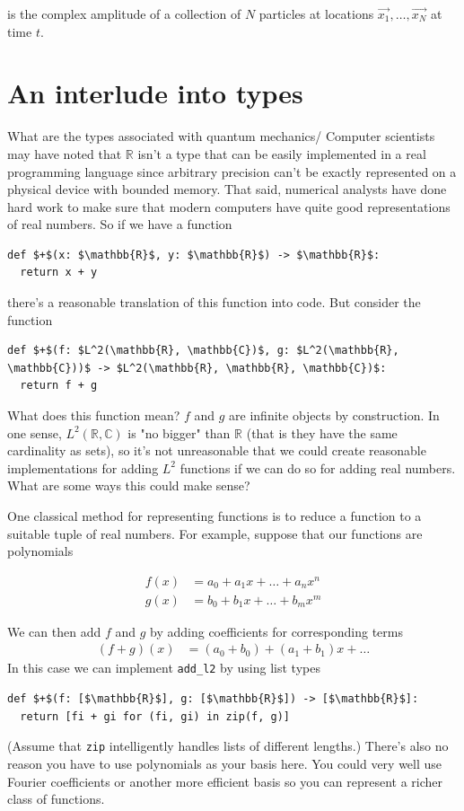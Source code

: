 \documentclass[book.tex]{subfiles}
\begin{document}
is the complex amplitude of a collection of $N$ particles at locations $\vec{x_1}, \dotsc, \vec{x_N}$ at time $t$.

\section{An interlude into types}


What are the types associated with quantum mechanics/ Computer scientists may have noted that $\mathbb{R}$ isn't a type that can be easily implemented in a real programming language since arbitrary precision can't be exactly represented on a physical device with bounded memory. That said, numerical analysts have done hard work to make sure that modern computers have quite good representations of real numbers. So if we have a function

\begin{lstlisting}
def $+$(x: $\mathbb{R}$, y: $\mathbb{R}$) -> $\mathbb{R}$:
  return x + y
\end{lstlisting}

\noindent there's a reasonable translation of this function into code. But consider the function

\begin{lstlisting}
def $+$(f: $L^2(\mathbb{R}, \mathbb{C})$, g: $L^2(\mathbb{R}, \mathbb{C}))$ -> $L^2(\mathbb{R}, \mathbb{R}, \mathbb{C})$:
  return f + g
\end{lstlisting}

What does this function mean? $f$ and $g$ are infinite objects by construction. In one sense, $L^2(\mathbb{R}, \mathbb{C})$ is "no bigger" than $\mathbb{R}$ (that is they have the same cardinality as sets), so it's not unreasonable that we could create reasonable implementations for adding $L^2$ functions if we can do so for adding real numbers. What are some ways this could make sense? 

One classical method for representing functions is to reduce a function to a suitable tuple of real numbers. For example, suppose that our functions are polynomials

\begin{align}
    f(x) &= a_0 + a_1 x + \dotsc + a_n x^n \\
    g(x) &= b_0 + b_1 x + \dotsc + b_m x^m
\end{align}

We can then add $f$ and $g$ by adding coefficients for corresponding terms
\begin{align}
    (f + g)(x) &= (a_0 + b_0) + (a_1 + b_1)x + \dotsc
\end{align}
In this case we can implement \lstinline{add_l2} by using list types
\begin{lstlisting}
def $+$(f: [$\mathbb{R}$], g: [$\mathbb{R}$]) -> [$\mathbb{R}$]:
  return [fi + gi for (fi, gi) in zip(f, g)]
\end{lstlisting}
\noindent (Assume that \lstinline{zip} intelligently handles lists of different lengths.) There's also no reason you have to use polynomials as your basis here. You could very well use Fourier coefficients or another more efficient basis so you can represent a richer class of functions. 
\end{document}
